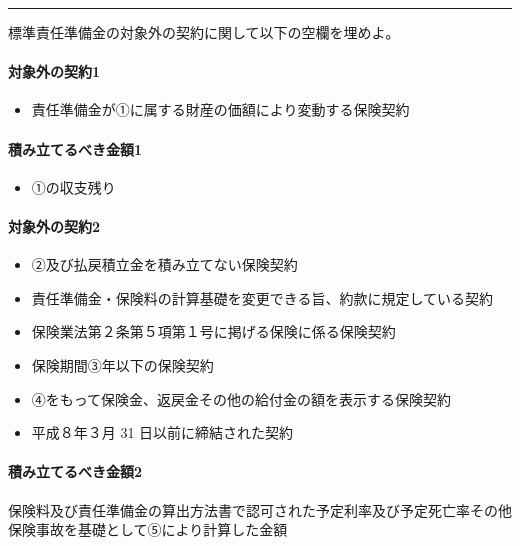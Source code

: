 \documentclass[report,gutter=10mm,fore-edge=10mm,uplatex,dvipdfmx]{jlreq}
\begin{document}
\begin{center}\rule{0.5\linewidth}{0.5pt}\end{center}


標準責任準備金の対象外の契約に関して以下の空欄を埋めよ。

\paragraph{対象外の契約1}

\begin{itemize}
\tightlist
\item
  責任準備金が①に属する財産の価額により変動する保険契約
\end{itemize}

\paragraph{積み立てるべき金額1}

\begin{itemize}
\tightlist
\item
  ①の収支残り
\end{itemize}

\paragraph{対象外の契約2}

\begin{itemize}
\tightlist
\item
  ②及び払戻積立金を積み立てない保険契約
\item
  責任準備金・保険料の計算基礎を変更できる旨、約款に規定している契約
\item
  保険業法第２条第５項第１号に掲げる保険に係る保険契約
\item
  保険期間③年以下の保険契約
\item
  ④をもって保険金、返戻金その他の給付金の額を表示する保険契約
\item
  平成８年３月 31 日以前に締結された契約
\end{itemize}

\paragraph{積み立てるべき金額2}

保険料及び責任準備金の算出方法書で認可された予定利率及び予定死亡率その他保険事故を基礎として⑤により計算した金額
\end{document}
